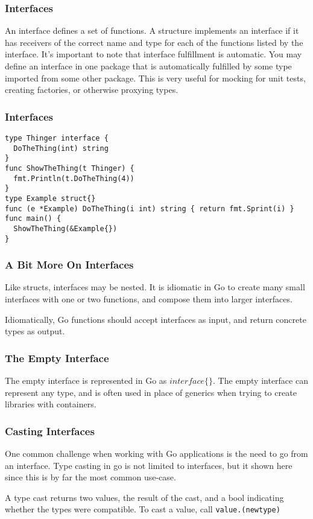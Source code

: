\documentclass{beamer}
\begin{document}
\begin{frame}
  \frametitle{Interfaces}
  An interface defines a set of functions.  A structure implements an
  interface if it has receivers of the correct name and type for each
  of the functions listed by the interface.  It's important to note
  that interface fulfillment is automatic.  You may define an
  interface in one package that is automatically fulfilled by some
  type imported from some other package.  This is very useful for
  mocking for unit tests, creating factories, or otherwise proxying
  types.
\end{frame}

\begin{frame}[fragile]
  \frametitle{Interfaces}
\begin{lstlisting}[language=Golang]
type Thinger interface {
  DoTheThing(int) string
}
func ShowTheThing(t Thinger) {
  fmt.Println(t.DoTheThing(4))
}
type Example struct{}
func (e *Example) DoTheThing(i int) string { return fmt.Sprint(i) }
func main() {
  ShowTheThing(&Example{})
}
\end{lstlisting}
\end{frame}

\begin{frame}
  \frametitle{A Bit More On Interfaces}
  Like structs, interfaces may be nested.  It is idiomatic in Go to
  create many small interfaces with one or two functions, and compose
  them into larger interfaces.

  Idiomatically, Go functions should accept interfaces as input, and
  return concrete types as output.
\end{frame}

\begin{frame}
  \frametitle{The Empty Interface}
  The empty interface is represented in Go as \emph{$interface\{\}$}.
  The empty interface can represent any type, and is often used in
  place of generics when trying to create libraries with containers.
\end{frame}


\begin{frame}[fragile]
  \frametitle{Casting Interfaces}
  One common challenge when working with Go applications is the need
  to go from an interface.  Type casting in go is not limited to
  interfaces, but it shown here since this is by far the most common
  use-case.

  A type cast returns two values, the result of the cast, and a bool
  indicating whether the types were compatible.  To cast a value, call
  \verb!value.(newtype)!
\end{frame}
\end{document}
